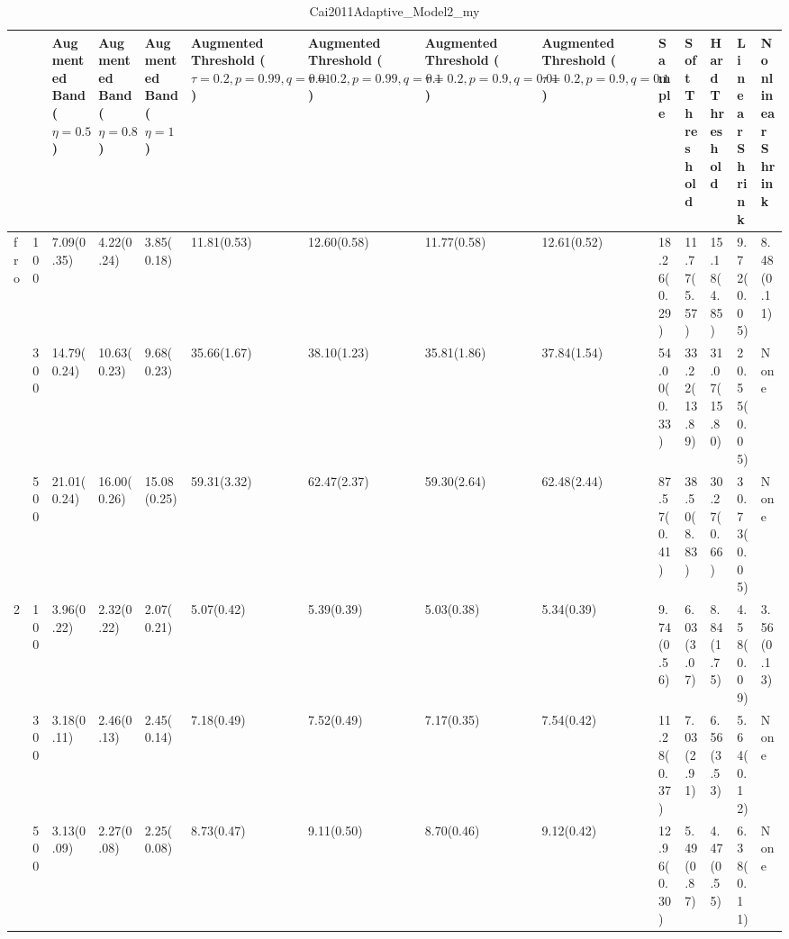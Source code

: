 \begin{table}[htbp]
\centering
\caption{Cai2011Adaptive_Model2_my}
\label{my label}
\begin{tabular}{ll|p{2cm}p{2cm}p{2cm}p{2cm}p{2cm}p{2cm}p{2cm}p{2cm}p{2cm}p{2cm}p{2cm}p{2cm}}
\toprule
  &     & Augmented Band ($\eta=0.5$) & Augmented Band ($\eta=0.8$) & Augmented Band ($\eta=1$) & Augmented Threshold ($\tau=0.2, p=0.99, q=0.01$) & Augmented Threshold ($\tau=0.2, p=0.99, q=0.1$) & Augmented Threshold ($\tau=0.2, p=0.9, q=0.01$) & Augmented Threshold ($\tau=0.2, p=0.9, q=0.1$) &       Sample & Soft Threshold & Hard Threshold & Linear Shrink & Nonlinear Shrink \\
\midrule
fro & 100 &                  7.09(0.35) &                  4.22(0.24) &                3.85(0.18) &                                      11.81(0.53) &                                     12.60(0.58) &                                     11.77(0.58) &                                    12.61(0.52) &  18.26(0.29) &    11.77(5.57) &    15.18(4.85) &    9.72(0.05) &       8.48(0.11) \\
  & 300 &                 14.79(0.24) &                 10.63(0.23) &                9.68(0.23) &                                      35.66(1.67) &                                     38.10(1.23) &                                     35.81(1.86) &                                    37.84(1.54) &  54.00(0.33) &   33.22(13.89) &   31.07(15.80) &   20.55(0.05) &             None \\
  & 500 &                 21.01(0.24) &                 16.00(0.26) &               15.08(0.25) &                                      59.31(3.32) &                                     62.47(2.37) &                                     59.30(2.64) &                                    62.48(2.44) &  87.57(0.41) &    38.50(8.83) &    30.27(0.66) &   30.73(0.05) &             None \\
2 & 100 &                  3.96(0.22) &                  2.32(0.22) &                2.07(0.21) &                                       5.07(0.42) &                                      5.39(0.39) &                                      5.03(0.38) &                                     5.34(0.39) &   9.74(0.56) &     6.03(3.07) &     8.84(1.75) &    4.58(0.09) &       3.56(0.13) \\
  & 300 &                  3.18(0.11) &                  2.46(0.13) &                2.45(0.14) &                                       7.18(0.49) &                                      7.52(0.49) &                                      7.17(0.35) &                                     7.54(0.42) &  11.28(0.37) &     7.03(2.91) &     6.56(3.53) &    5.64(0.12) &             None \\
  & 500 &                  3.13(0.09) &                  2.27(0.08) &                2.25(0.08) &                                       8.73(0.47) &                                      9.11(0.50) &                                      8.70(0.46) &                                     9.12(0.42) &  12.96(0.30) &     5.49(0.87) &     4.47(0.55) &    6.38(0.11) &             None \\
\bottomrule
\end{tabular}
\end{table}
